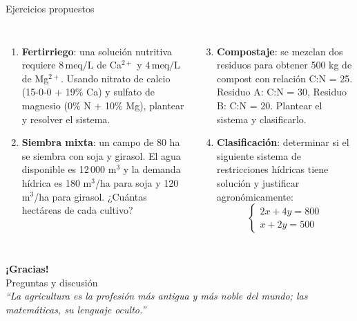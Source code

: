 \documentclass[11pt, aspectratio=169]{beamer}
\begin{document}
\begin{frame}{Ejercicios propuestos}
  \small
  \begin{columns}[T]
    \begin{enumerate}
      \item \textbf{Fertirriego}: una solución nutritiva requiere
        $8\,\text{meq/L}$ de Ca$^{2+}$ y $4\,\text{meq/L}$ de Mg$^{2+}$.
        Usando nitrato de calcio (15-0-0 + 19\% Ca) y sulfato de magnesio
        (0\% N + 10\% Mg), plantear y resolver el sistema.

      \vspace{0.6em}
      \item \textbf{Siembra mixta}: un campo de 80 ha se siembra con soja
        y girasol. El agua disponible es 12\,000 m$^3$ y la demanda
        hídrica es 180 m$^3$/ha para soja y 120 m$^3$/ha para girasol.
        ¿Cuántas hectáreas de cada cultivo?
    \end{enumerate}

    \begin{enumerate}
      \setcounter{enumi}{2}
      \item \textbf{Compostaje}: se mezclan dos residuos para obtener
        500 kg de compost con relación C:N = 25.
        Residuo A: C:N = 30, Residuo B: C:N = 20.
        Plantear el sistema y clasificarlo.

      \vspace{0.6em}
      \item \textbf{Clasificación}: determinar si el siguiente sistema
        de restricciones hídricas tiene solución y justificar
        agronómicamente:
        \[
          \left\{\begin{array}{l}
            2x + 4y = 800 \\
            x + 2y = 500
          \end{array}\right.
        \]
    \end{enumerate}
  \end{columns}
\end{frame}

\begin{frame}[plain]
  \begin{center}
    {\Large\color{verdecampo}\textbf{¡Gracias!}}\\[1em]
    {\normalsize Preguntas y discusión}\\[2em]
    \textit{``La agricultura es la profesión más antigua y más noble del mundo;
    las matemáticas, su lenguaje oculto.''}\\[1.5em]
  \end{center}
\end{frame}
\end{document}
